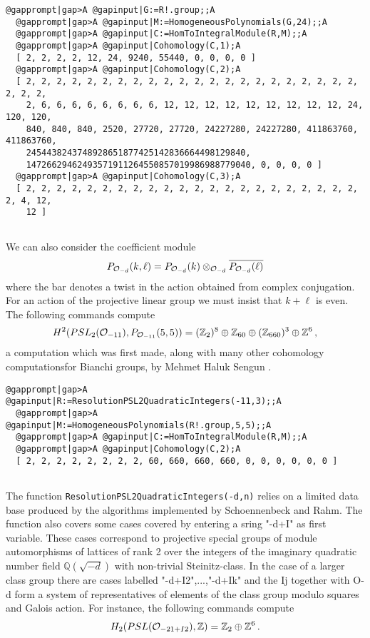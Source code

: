 \documentclass[a4paper,11pt]{report}
\begin{document}
{{\begin{Verbatim}[commandchars=@|A,fontsize=\small,frame=single,label=Example]
  @gapprompt|gap>A @gapinput|G:=R!.group;;A
  @gapprompt|gap>A @gapinput|M:=HomogeneousPolynomials(G,24);;A
  @gapprompt|gap>A @gapinput|C:=HomToIntegralModule(R,M);;A
  @gapprompt|gap>A @gapinput|Cohomology(C,1);A
  [ 2, 2, 2, 2, 12, 24, 9240, 55440, 0, 0, 0, 0 ]
  @gapprompt|gap>A @gapinput|Cohomology(C,2);A
  [ 2, 2, 2, 2, 2, 2, 2, 2, 2, 2, 2, 2, 2, 2, 2, 2, 2, 2, 2, 2, 2, 2, 2, 2, 2, 
    2, 6, 6, 6, 6, 6, 6, 6, 6, 12, 12, 12, 12, 12, 12, 12, 12, 12, 24, 120, 120, 
    840, 840, 840, 2520, 27720, 27720, 24227280, 24227280, 411863760, 411863760, 
    2454438243748928651877425142836664498129840, 
    14726629462493571911264550857019986988779040, 0, 0, 0, 0 ]
  @gapprompt|gap>A @gapinput|Cohomology(C,3);A
  [ 2, 2, 2, 2, 2, 2, 2, 2, 2, 2, 2, 2, 2, 2, 2, 2, 2, 2, 2, 2, 2, 2, 2, 4, 12, 
    12 ]
  
\end{Verbatim}
 

We can also consider the coefficient module 
\[ P_{{\cal O}_{-d}}(k,\ell) = P_{{\cal O}_{-d}}(k) \otimes_{{\cal O}_{-d}}
\overline{P_{{\cal O}_{-d}}(\ell)} \]
 where the bar denotes a twist in the action obtained from complex conjugation.
For an action of the projective linear group we must insist that $k+\ell$ is even. The following commands compute 
\[H^2(PSL_2({\cal O}_{-11}),P_{{\cal O}_{-11}}(5,5)) = (\mathbb Z_2)^8 \oplus
\mathbb Z_{60} \oplus (\mathbb Z_{660})^3 \oplus \mathbb Z^6\,, \]
 a computation which was first made, along with many other cohomology
computationsfor Bianchi groups, by Mehmet Haluk Sengun \cite{sengun}. 
\begin{Verbatim}[commandchars=@|A,fontsize=\small,frame=single,label=Example]
  @gapprompt|gap>A @gapinput|R:=ResolutionPSL2QuadraticIntegers(-11,3);;A
  @gapprompt|gap>A @gapinput|M:=HomogeneousPolynomials(R!.group,5,5);;A
  @gapprompt|gap>A @gapinput|C:=HomToIntegralModule(R,M);;A
  @gapprompt|gap>A @gapinput|Cohomology(C,2);A
  [ 2, 2, 2, 2, 2, 2, 2, 2, 60, 660, 660, 660, 0, 0, 0, 0, 0, 0 ]
  
\end{Verbatim}
 

The function \texttt{ResolutionPSL2QuadraticIntegers(-d,n)} relies on a limited data base produced by the algorithms implemented by
Schoennenbeck and Rahm. The function also covers some cases covered by
entering a sring "-d+I" as first variable. These cases correspond to
projective special groups of module automorphisms of lattices of rank 2 over
the integers of the imaginary quadratic number field $\mathbb Q(\sqrt{-d})$ with non-trivial Steinitz-class. In the case of a larger class group there are
cases labelled "-d+I2",...,"-d+Ik" and the Ij together with O-d form a system
of representatives of elements of the class group modulo squares and Galois
action. For instance, the following commands compute 
\[H_2(PSL({\cal O}_{-21+I2}),\mathbb Z) = \mathbb Z_2\oplus \mathbb Z^6\, .\]
 
}}
\end{document}
